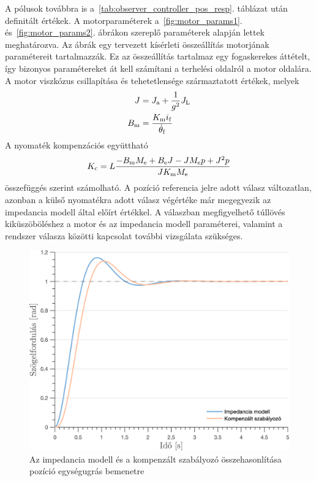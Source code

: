 A pólusok továbbra is a~\ref{tab:observer_controller_pos_resp}. táblázat után definitált értékek.
A motorparaméterek a~\ref{fig:motor_params1}. és~\ref{fig:motor_params2}. ábrákon szereplő paraméterek 
alapján lettek meghatározva. Az ábrák egy tervezett kísérleti összeállítás motorjának paramétereit 
tartalmazzák. Ez az összeállítás tartalmaz egy fogaskerekes áttételt, így bizonyos paramétereket 
át kell számítani a terhelési oldalról a motor oldalára. A motor viszkózus csillapítása és tehetetlensége származtatott értékek, melyek 
\begin{align}
    \begin{split}
        J &= J_{\mathrm{a}} + \frac{1}{g^2}J_{\mathrm{L}} \\
        B_{\mathrm{m}} &= \frac{K_{\mathrm{m}} i_{\mathrm{f}}}{\dot{\theta}_{\mathrm{f}}}
    \end{split}
\end{align}
A nyomaték kompenzációs együttható
\begin{equation}
    K_{\mathrm{c}} = L\frac{- B_{\mathrm{m}} M_{\mathrm{e}} + B_{\mathrm{e}} J - J M_{\mathrm{e}} p + J^2 p}{J K_{\mathrm{m}} M_{\mathrm{e}}}
\end{equation}
összefüggés szerint számolható.
A pozíció referencia jelre adott válasz változatlan, azonban a külső nyomatékra adott válasz végértéke már
megegyezik az impedancia modell által előírt értékkel. A válaszban megfigyelhető túllövés kiküszöböléshez
a motor és az impedancia modell paraméterei, valamint a rendszer válasza közötti kapcsolat további vizsgálata szükséges.

\begin{figure}[ht]
    \begin{center}
    \includegraphics[width=\textwidth]{images/observer_controller_pos_resp_direct_comp.png}
    \caption{Az impedancia modell és a kompenzált szabályozó összehasonlítása pozíció egységugrás bemenetre}\label{fig:observer_controller_pos_resp_direct}
    \end{center}
\end{figure}

